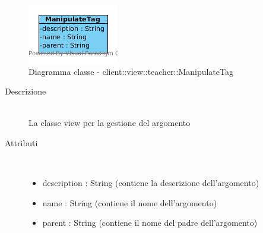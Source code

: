 \begin{center}
			\begin{figure}[H]
				\centering \includegraphics[scale=4, max width=\textwidth, max height=\myheight]{../img/diagrammiClassi/client/view/teacher/ManipulateTag.png}
				\caption{Diagramma classe - client::view::teacher::ManipulateTag}
			\end{figure}
		\end{center}\begin{description}
\item[Descrizione] \hfill \\
 La classe view per la gestione del argomento
\item[Attributi] \hfill \\
 \vspace{-7mm}
\begin{itemize}
\item description : String (contiene la descrizione dell'argomento)
\item name : String (contiene il nome dell'argomento)
\item parent : String (contiene il nome del padre dell'argomento)
\end{itemize}

\end{description}

